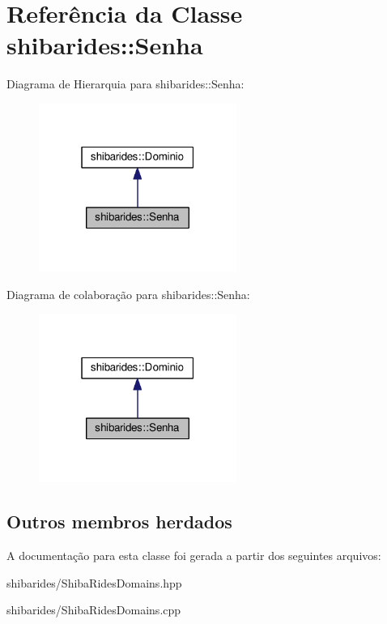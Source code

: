 \hypertarget{classshibarides_1_1Senha}{}\section{Referência da Classe shibarides\+:\+:Senha}
\label{classshibarides_1_1Senha}


Diagrama de Hierarquia para shibarides\+:\+:Senha\+:\nopagebreak
\begin{figure}[H]
\begin{center}
\leavevmode
\includegraphics[width=183pt]{classshibarides_1_1Senha__inherit__graph}
\end{center}
\end{figure}


Diagrama de colaboração para shibarides\+:\+:Senha\+:\nopagebreak
\begin{figure}[H]
\begin{center}
\leavevmode
\includegraphics[width=183pt]{classshibarides_1_1Senha__coll__graph}
\end{center}
\end{figure}
\subsection*{Outros membros herdados}


A documentação para esta classe foi gerada a partir dos seguintes arquivos\+:\begin{DoxyCompactItemize}
\item 
shibarides/Shiba\+Rides\+Domains.\+hpp\item 
shibarides/Shiba\+Rides\+Domains.\+cpp\end{DoxyCompactItemize}

